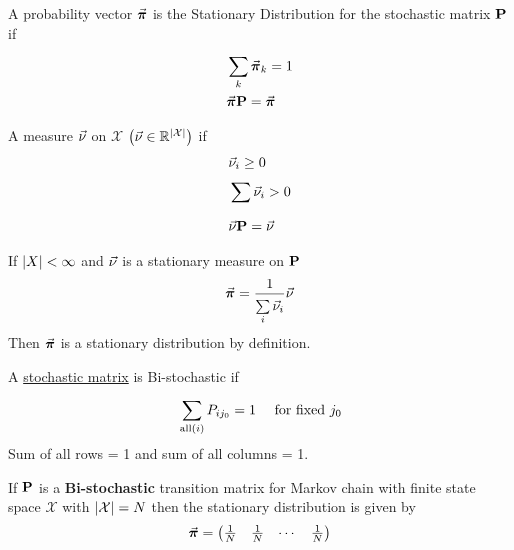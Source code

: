 \documentclass[12pt,a4paper]{article}
\begin{document}
\begin{defn}
    A probability vector $\va*{\pi}$ is the Stationary Distribution for the stochastic matrix $\vb{P}$ if 
    \begin{align*}
        &\sum\limits_{k}^{}\va*\pi_k = 1\\
        &\va*{\pi}\vb{P} = \va*{\pi}
    \end{align*}
\end{defn}
\begin{defn}
    A measure $\va\nu$ on $\mathcal{X}$ $\left(\va\nu \in \mathbb{R}^{\abs{\mathcal{X}}}\right)$ if 
    \begin{align*}
        &\va \nu_i \geq 0\\
        &\sum\limits_{}^{}\va\nu_i > 0\\
        &\va\nu \vb{P} = \va\nu
    \end{align*}
\end{defn}
\begin{prop}
    \label{statdm}
    If $\abs{X} < \infty$ and $\va\nu$ is a stationary measure on $\vb P$  
    \begin{align*}
        \va*\pi = \frac{1}{\sum\limits_{i}^{}\va\nu_i}\va\nu
    \end{align*}
    Then $\va*\pi$ is a stationary distribution by definition.
\end{prop}
\begin{defn}
    A \hyperref[stocmat]{stochastic matrix} is Bi-stochastic if 
    \begin{align*}
        &\sum\limits_{\mathrm{all}(i)}^{}P_{ij_0} = 1 & \text{ for fixed $j_0$}
    \end{align*}
    Sum of all rows = 1 and sum of all columns = 1.   
\end{defn}

\begin{prop}
    If $\vb P$ is a \textbf{Bi-stochastic} transition matrix for Markov chain with finite state space $\mathcal{X}$ with $\abs{\mathcal{X}} = N$ then the stationary distribution is given by 
    \begin{align*}
        \va*\pi = \mqty(\frac{1}{N} & \frac{1}{N} & \cdots & \frac{1}{N})
    \end{align*}
\end{prop}
\newpage
\end{document}
